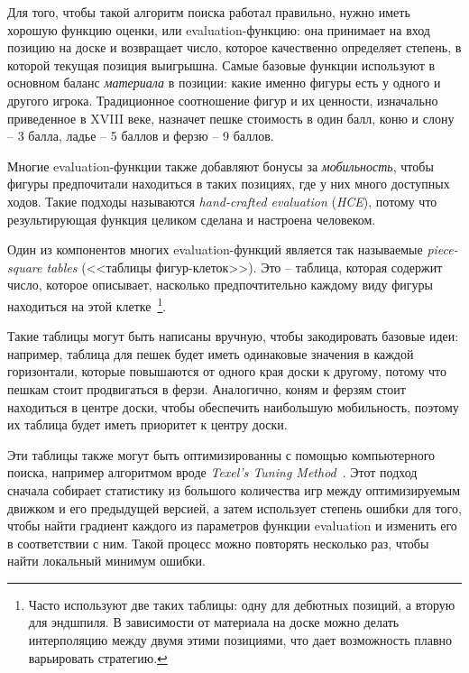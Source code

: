 \documentclass{article}
\begin{document}
Для того, чтобы такой алгоритм поиска работал правильно,
нужно иметь хорошую функцию оценки, или evaluation-функцию:
она принимает на вход позицию на доске и возвращает число,
которое качественно определяет степень,
в которой текущая позиция выигрышна.
Самые базовые функции используют в основном баланс \emph{материала} в позиции:
какие именно фигуры есть у одного и другого игрока.
Традиционное соотношение фигур и их ценности,
изначально приведенное в XVIII веке,
назначет пешке стоимость в один балл,
коню и слону -- 3 балла,
ладье -- 5 баллов
и ферзю -- 9 баллов.

Многие evaluation-функции также добавляют бонусы за \emph{мобильность},
чтобы фигуры предпочитали находиться в таких позициях,
где у них много доступных ходов.
Такие подходы называются \emph{hand-crafted evaluation} (\emph{HCE}),
потому что результирующая функция целиком сделана и настроена человеком.

Один из компонентов многих evaluation-функций является
так называемые \emph{piece-square tables} (<<таблицы фигур-клеток>>).
Это -- таблица, которая содержит число, которое описывает,
насколько предпочтительно каждому виду фигуры находиться на этой клетке~\footnote{
    Часто используют две таких таблицы: одну для дебютных позиций,
    а вторую для эндшпиля.
    В зависимости от материала на доске
    можно делать интерполяцию между двумя этими позициями,
    что дает возможность плавно варьировать стратегию.
}.

Такие таблицы могут быть написаны вручную,
чтобы закодировать базовые идеи:
например, таблица для пешек будет иметь одинаковые значения в каждой горизонтали,
которые повышаются от одного края доски к другому,
потому что пешкам стоит продвигаться в ферзи.
Аналогично, коням и ферзям стоит находиться в центре доски,
чтобы обеспечить наибольшую мобильность,
поэтому их таблица будет иметь приоритет к центру доски.

Эти таблицы также могут быть оптимизированны с помощью компьютерного поиска,
например алгоритмом вроде \emph{Texel's Tuning Method}~\cite{texel-tuning}.
Этот подход сначала собирает статистику из большого количества игр
между оптимизируемым движком и его предыдущей версией,
а затем использует степень ошибки для того, чтобы найти градиент каждого из параметров функции evaluation
и изменить его в соответствии с ним.
Такой процесс можно повторять несколько раз,
чтобы найти локальный минимум ошибки.
\end{document}
